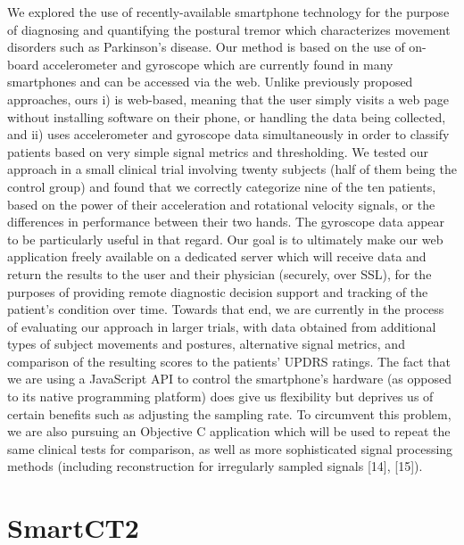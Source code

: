 We explored the use of recently-available smartphone technology for the purpose of diagnosing and quantifying the postural tremor which characterizes movement disorders such as Parkinson’s disease. Our method is based on the use of on-board accelerometer and gyroscope which are currently found in many smartphones and can be accessed via the web. Unlike previously proposed approaches, ours i) is web-based, meaning that the user simply visits a web page without installing software on their phone, or handling the data being collected, and ii) uses accelerometer and gyroscope data simultaneously in order to classify patients based on very simple signal metrics and thresholding. 
We tested our approach in a small clinical trial involving twenty subjects (half of them being the control group) and found that we correctly categorize nine of the ten patients, based on the power of their acceleration and rotational velocity signals, or the differences in performance between their two hands. The gyroscope data appear to be particularly useful in that regard.
Our goal is to ultimately make our web application freely available on a dedicated server which will receive data and return the results to the user and their physician (securely, over SSL), for the purposes of providing remote diagnostic decision support and tracking of the patient’s condition over time. Towards that end, we are currently in the process of evaluating our approach in larger trials, with data obtained from additional types of subject movements and postures, alternative signal metrics, and comparison of the resulting scores to the patients’ UPDRS ratings. 
The fact that we are using a JavaScript API to control the smartphone’s hardware (as opposed to its native programming platform) does give us flexibility but deprives us of certain benefits such as adjusting the sampling rate. To circumvent this problem, we are also pursuing an Objective C application which will be used to repeat the same clinical tests for comparison, as well as more sophisticated signal processing methods (including reconstruction for irregularly sampled signals [14], [15]). 

\section{SmartCT2}
\label{sec:SmartCT2}

